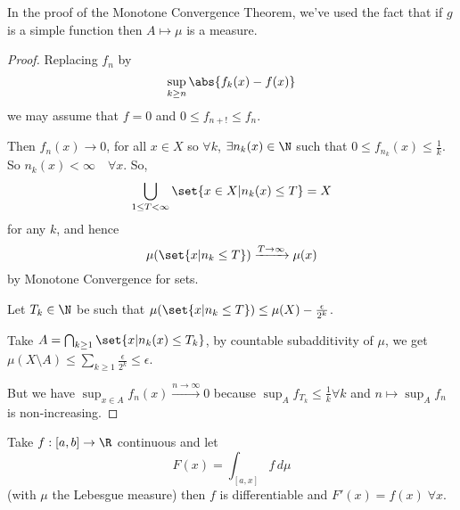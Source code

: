 \documentclass{article}
\newcommand{\1}[1]{\mathbbm{1}_{#1}}
\begin{document}
In the proof of the Monotone Convergence Theorem, we've used the fact that if $g$ is a simple function then $A \mapsto \mu$ %
is a measure.


\begin{proof}
    Replacing $f_n$ by
    \begin{equation*}
        \sup_{k \geq n} \abs{f_k(x) - f(x)}
    \end{equation*}
    we may assume that $f = 0$ and $0 \leq f_{n+!} \leq f_n$.

    Then $f_n(x) \to 0$, for all $x \in X$ so $\forall k$, $\exists n_k(x) \in \N$ such that $0 \leq f_{n_k}(x) \leq \frac{1}{k}$.
    So $n_k(x) < \infty \quad \forall x$.
    So,
    \begin{equation*}
        \bigcup_{1 \leq T < \infty} \set{x \in X | n_k(x) \leq T} = X
    \end{equation*}
    for any $k$, and hence
    \begin{equation*}
        \mu(\set{x | n_k \leq T}) \xrightarrow{T\to\infty} \mu(x)
    \end{equation*}
    by Monotone Convergence for sets.

    Let $T_k \in \N$ be such that $\mu(\set{x | n_k \leq T}) \leq \mu(X) - \frac{\epsilon}{2^k}$.

    Take $A = \bigcap_{k \geq 1} \set{x | n_k(x) \leq T_k}$, by countable subadditivity of $\mu$, we get $\mu(X \setminus A) \leq \sum_{k \geq 1} \frac{\epsilon}{2^k} \leq \epsilon$.

    But we have $\sup_{x \in A} f_n(x) \xrightarrow{n \to \infty} 0$ because $\sup_A f_{T_k} \leq \frac{1}{k} \forall k$ and $n \mapsto \sup_A f_n$ is non-increasing.
\end{proof}

\begin{thm}
    Take $f: [a, b] \to \R$ continuous and let
    \begin{equation*}
        F(x) = \int_{[a, x]} f\,d\mu
    \end{equation*}
    (with $\mu$ the Lebesgue measure) then $f$ is differentiable and $F'(x) = f(x) \; \forall x$.
\end{thm}
\end{document}
